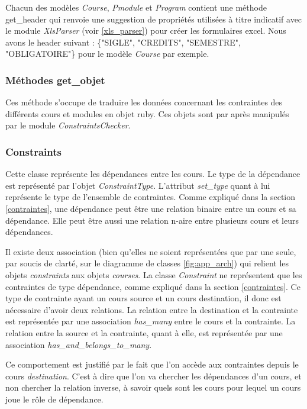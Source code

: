 Chacun des modèles \textit{Course}, \textit{Pmodule} et \textit{Program} contient une méthode get\_header qui renvoie une suggestion de propriétés utilisées à titre indicatif avec le module \textit{XlsParser} (voir \ref{xls_parser}) pour créer les formulaires excel. Nous avons le header suivant : \{"SIGLE", "CREDITS", "SEMESTRE", "OBLIGATOIRE"\} pour le modèle \textit{Course} par exemple.

\subsubsection{Méthodes get\_objet}
Ces méthode s'occupe de traduire les données concernant les contraintes des différents cours et modules en objet ruby. Ces objets sont par après manipulés par le module \textit{ConstraintsChecker}. 
\subsubsection{Constraints}
Cette classe représente les dépendances entre les cours. Le type de la dépendance est représenté par l'objet \textit{ConstraintType}. L'attribut \textit{set\_type} quant à lui représente le type de l'ensemble de contraintes. Comme expliqué dans la section \ref{contraintes}, une dépendance peut être une relation binaire entre un cours et sa dépendance. Elle peut être aussi une relation n-aire entre plusieurs cours et leurs dépendances.

Il existe deux association (bien qu'elles ne soient représentées que par une seule, par soucis de clarté, sur le diagramme de classes \ref{fig:app_arch}) qui relient les objets \textit{constraints} aux objets \textit{courses}. La classe \textit{Constraint} ne représentent que les contraintes de type dépendance, comme expliqué dans la section \ref{contraintes}. Ce type de contrainte ayant un cours source et un cours destination, il donc est nécessaire d'avoir deux relations.  La relation entre la destination et la contrainte est représentée par une association \textit{has\_many} entre le cours et la contrainte. La relation entre la source et la contrainte, quant à elle, est représentée par une association \textit{has\_and\_belongs\_to\_many}. 

Ce comportement est justifié par le fait que l'on accède aux contraintes depuis le cours \textit{destination}. C'est à dire que l'on va chercher les dépendances d'un cours, et non chercher la relation inverse, à savoir quels sont les cours pour lequel un cours joue le rôle de dépendance.

